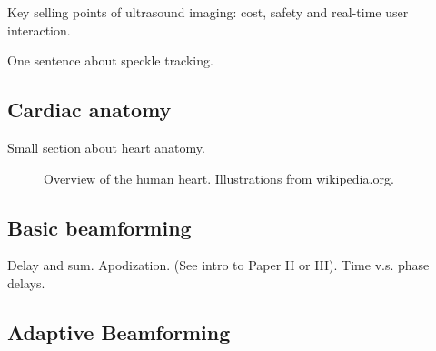 Key selling points of ultrasound imaging: cost, safety and real-time user interaction.

One sentence about speckle tracking.

\subsection{Cardiac anatomy}
Small section about heart anatomy.

\begin{figure}
\centering
{}
\caption{Overview of the human heart. Illustrations from wikipedia.org.}
\label{fig:human_heart}
\end{figure}
							
\subsection{Basic beamforming}

Delay and sum. Apodization. (See intro to Paper II or III).
Time v.s. phase delays.

\subsection{Adaptive Beamforming}\label{sec:adaptbf}

